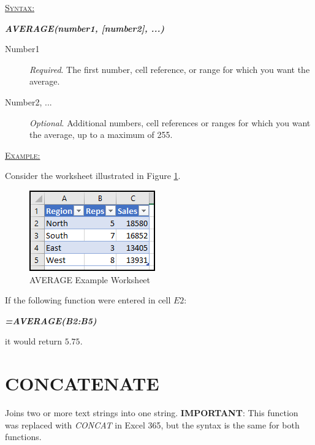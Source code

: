 \begin{addmargin}[1cm]{0cm}

	\medskip
	\underline{\textsc{Syntax:}}
	\medskip

	{\color{Syntax}
		\noindent\textbf{\textit{AVERAGE(number1, [number2], ...)}}
	}
	
	\begin{description}
		\item[Number1] \textit{Required}. The first number, cell reference, or range for which you want the average.
		\item[Number2, ...] \textit{Optional}. Additional numbers, cell references or ranges for which you want the average, up to a maximum of 255.
	\end{description}

	\medskip
	\noindent\underline{\textsc{Example:}}
	\medskip
	
	\noindent Consider the worksheet illustrated in Figure \ref{apa:avr}.

	\begin{figure}[H]
		\centering
		\includegraphics[width=\maxwidth{.45\linewidth}]{gfx/apa_fig01}
		\caption{AVERAGE Example Worksheet}
		\label{apa:avr}
	\end{figure}
	
	\noindent If the following function were entered in cell $ E2 $:
	
	{\color{Syntax}
		\textit{\textbf{=AVERAGE(B2:B5)}}
	}
	
	\noindent it would return $ 5.75 $.

\end{addmargin}

\section{CONCATENATE}

Joins two or more text strings into one string. \textbf{IMPORTANT}: This function was replaced with \textit{CONCAT} in Excel 365, but the syntax is the same for both functions.

